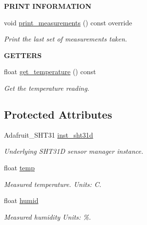 \begin{Indent}{\bf P\+R\+I\+NT I\+N\+F\+O\+R\+M\+A\+T\+I\+ON}\par
\begin{DoxyCompactItemize}
\item 
void \hyperlink{class_loom___s_h_t31_d_a4f1fd015893c2de68bce6f68ce9e1a81}{print\+\_\+measurements} () const override
\begin{DoxyCompactList}\small\item\em Print the last set of measurements taken. \end{DoxyCompactList}\end{DoxyCompactItemize}
\end{Indent}
\begin{Indent}{\bf G\+E\+T\+T\+E\+RS}\par
\begin{DoxyCompactItemize}
\item 
float \hyperlink{class_loom___s_h_t31_d_a0c671dbf6cdb7ce3ec0eee43a7071288}{get\+\_\+temperature} () const 
\begin{DoxyCompactList}\small\item\em Get the temperature reading. \end{DoxyCompactList}\end{DoxyCompactItemize}
\end{Indent}
\subsection*{Protected Attributes}
\begin{DoxyCompactItemize}
\item 
Adafruit\+\_\+\+S\+H\+T31 \hyperlink{class_loom___s_h_t31_d_a83749e1a9e51c760894f9ba0ec097bbf}{inst\+\_\+sht31d}
\begin{DoxyCompactList}\small\item\em Underlying S\+H\+T31D sensor manager instance. \end{DoxyCompactList}\item 
float \hyperlink{class_loom___s_h_t31_d_a3a3d827860de7979d783b9f472379028}{temp}
\begin{DoxyCompactList}\small\item\em Measured temperature. Units\+: C. \end{DoxyCompactList}\item 
float \hyperlink{class_loom___s_h_t31_d_aa52f9a6c11c80630b8616e5e7c54e803}{humid}
\begin{DoxyCompactList}\small\item\em Measured humidity Units\+: \%. \end{DoxyCompactList}\end{DoxyCompactItemize}
